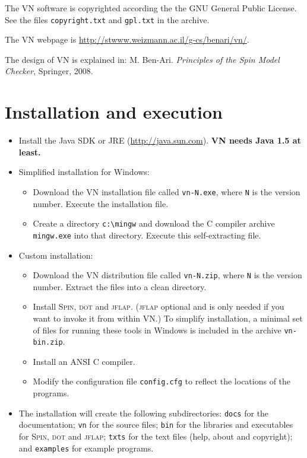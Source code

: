 \documentclass[11pt]{article}
\newcommand{\vn}{\textsc{VN}}
\newcommand{\jf}{\textsc{jflap}}
\newcommand{\dt}{\textsc{dot}}
\newcommand{\spn}{\textsc{Spin}}
\newcommand{\p}[1]{\texttt{#1}}
\begin{document}
The \vn{} software is copyrighted according the the GNU General Public License.
See the files \p{copyright.txt} and \p{gpl.txt} in the archive.

The \vn{} webpage is \url{http://stwww.weizmann.ac.il/g-cs/benari/vn/}.

The design of \vn{} is explained in:
M. Ben-Ari. \textit{Principles of the Spin Model Checker}, Springer, 2008.

\newpage

\section{Installation and execution}

\begin{itemize}
\item Install the Java SDK or JRE (\url{http://java.sun.com}).
\textbf{\vn{} needs Java 1.5 at least.}

\item Simplified installation for Windows:
\begin{itemize}
\item Download the \vn{} installation file called \p{vn-N.exe},
where \p{N} is the version number.
Execute the installation file.
\item Create a directory \verb=c:\mingw= and download the C 
compiler archive \p{mingw.exe} into that directory. Execute this self-extracting file.
\end{itemize}

\item Custom installation:
\begin{itemize}
\item Download the \vn{} distribution file called \p{vn-N.zip},
where \p{N} is the version number.
Extract the files into a clean directory.
\item Install \spn{}, \dt{} and \jf{}.
(\jf{} optional and is only needed if you want to invoke it from within \vn{}.)
To simplify installation, a minimal set of files 
for running these tools in Windows is included in the archive \p{vn-bin.zip}.
\item Install an ANSI C compiler.
\item Modify the configuration file \p{config.cfg} to reflect the
locations of the programs.
\end{itemize}

\item The installation will create the following subdirectories: \p{docs} for the
documentation; \p{vn} for the source files; \p{bin} for the libraries and executables
for \spn{}, \dt{} and \jf{}; \p{txts} for the text files
(help, about and copyright); and \p{examples} for example programs.


\end{itemize}
\end{document}
